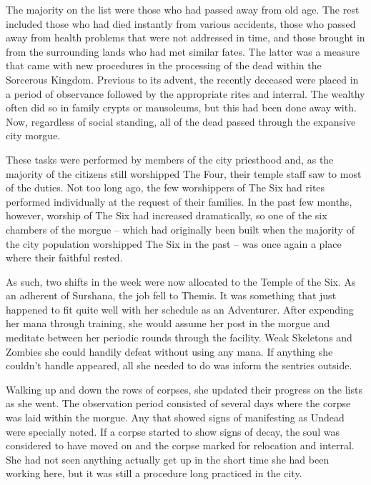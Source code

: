  

The majority on the list were those who had passed away from old age. The rest included those who had died instantly from various accidents, those who passed away from health problems that were not addressed in time, and those brought in from the surrounding lands who had met similar fates. The latter was a measure that came with new procedures in the processing of the dead within the Sorcerous Kingdom. Previous to its advent, the recently deceased were placed in a period of observance followed by the appropriate rites and interral. The wealthy often did so in family crypts or mausoleums, but this had been done away with. Now, regardless of social standing, all of the dead passed through the expansive city morgue.

 

These tasks were performed by members of the city priesthood and, as the majority of the citizens still worshipped The Four, their temple staff saw to most of the duties. Not too long ago, the few worshippers of The Six had rites performed individually at the request of their families. In the past few months, however, worship of The Six had increased dramatically, so one of the six chambers of the morgue – which had originally been built when the majority of the city population worshipped The Six in the past – was once again a place where their faithful rested.

 

As such, two shifts in the week were now allocated to the Temple of the Six. As an adherent of Surshana, the job fell to Themis. It was something that just happened to fit quite well with her schedule as an Adventurer. After expending her mana through training, she would assume her post in the morgue and meditate between her periodic rounds through the facility. Weak Skeletons and Zombies she could handily defeat without using any mana. If anything she couldn't handle appeared, all she needed to do was inform the sentries outside.

 

Walking up and down the rows of corpses, she updated their progress on the lists as she went. The observation period consisted of several days where the corpse was laid within the morgue. Any that showed signs of manifesting as Undead were specially noted. If a corpse started to show signs of decay, the soul was considered to have moved on and the corpse marked for relocation and interral. She had not seen anything actually get up in the short time she had been working here, but it was still a procedure long practiced in the city.


